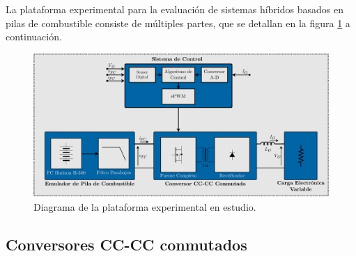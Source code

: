 La plataforma experimental para la evaluación de sistemas híbridos basados en pilas de combustible consiste de múltiples partes, que se detallan en la figura \ref{diag_plataforma} a continuación.

\begin{figure}[H]
    \centering
    \includegraphics[scale=0.4]{Imagenes/Plataforma Experimental.pdf}
    \caption{Diagrama de la plataforma experimental en estudio.}
    \label{diag_plataforma}
\end{figure}



\subsection{Conversores CC-CC conmutados}

